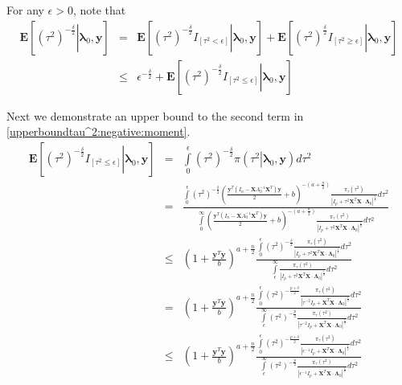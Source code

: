 \documentclass[noinfoline,11pt]{imsart}
\numberwithin{equation}{section}
\theoremstyle{plain}
\newcommand{\y}{\mathbf{y}}
\newcommand{\X}{\mathbf{X}}
\newcommand{\bl}{\boldsymbol{\lambda}}
\newcommand{\Bl}{\boldsymbol{\Lambda}}
\newcommand{\E}{\boldsymbol{E}}
\begin{document}
\proof For any $\epsilon > 0$, note that 
\begin{eqnarray}\label{upperboundtau^2:negative:moment}
 \E\left[\left.\left(\tau^2\right)^{-\frac{\delta}{2}}\right| \bl_0,\y\right]&=&\E\left[\left.\left(\tau^2\right)^{-\frac{\delta}{2}}I_{\left[\tau^2<\epsilon\right]}\right| \bl_0,\y\right]+\E\left[\left.\left(\tau^2\right)^{\frac{\delta}{2}}I_{\left[\tau^2\geq\epsilon\right]}\right| \bl_0,\y\right]\nonumber \\
&\leq & \epsilon^{-\frac{\delta}{2}}+\E\left[\left.\left(\tau^2\right)^{-\frac{\delta}{2}}I_{\left[\tau^2\leq\epsilon\right]}\right| \bl_0,\y\right] \end{eqnarray}

\noindent
Next we demonstrate an upper bound to the second term in \eqref{upperboundtau^2:negative:moment}.
\begin{eqnarray}
 \E\left[\left.\left(\tau^2\right)^{-\frac{\delta}{2}}I_{\left[\tau^2\leq\epsilon\right]}\right| \bl_0,\y\right]&=&\int\limits_0^{\epsilon}\left(\tau^2\right)^{-\frac{\delta}{2}}\pi\left(\left.\tau^2\right|\bl_0,\y\right)d\tau^2 \nonumber\\
 &=& \frac{\int\limits_0^{\epsilon}\left(\tau^2\right)^{-\frac{\delta}{2}}\left(\frac{\y^T\left(I_n-\X A_0^{-1}\X^T\right)\y}{2}+b\right)^{-\left(a+\frac{n}{2}\right)}\frac{\pi_\tau\left(\tau^2\right)}{\left|I_p+\tau^2\X^T\X\cdot\Bl_0\right|^{\frac{1}{2}}}d\tau^2}{\int\limits_{0}^\infty\left(\frac{\y^T\left(I_n-\X A_0^{-1}\X^T\right)\y}{2}+b\right)^{-\left(a+\frac{n}{2}\right)}\frac{\pi_\tau\left(\tau^2\right)}{\left|I_p+\tau^2\X^T\X\cdot\Bl_0\right|^{\frac{1}{2}}}d\tau^2} \nonumber\\
 &\leq& \left(1+\frac{\y^T\y}{b}\right)^{a+\frac{n}{2}}\frac{\int\limits_0^{\epsilon}\left(\tau^2\right)^{-\frac{\delta}{2}}\frac{\pi_\tau\left(\tau^2\right)}{\left|I_p+\tau^2\X^T\X\cdot\Bl_0\right|^{\frac{1}{2}}}d\tau^2}{\int\limits_\epsilon^\infty\frac{\pi_\tau\left(\tau^2\right)}{\left|I_p+\tau^2\X^T\X\cdot\Bl_0\right|^{\frac{1}{2}}}d\tau^2} \nonumber\\
 &=& \left(1+\frac{\y^T\y}{b}\right)^{a+\frac{n}{2}}\frac{\int\limits_0^{\epsilon}\left(\tau^2\right)^{-\frac{p+\delta}{2}}\frac{\pi_\tau\left(\tau^2\right)}{\left|\tau^{-2}I_p+\X^T\X\cdot\Bl_0\right|^{\frac{1}{2}}}d\tau^2}{\int\limits_\epsilon^\infty\left(\tau^2\right)^{-\frac{p}{2}}\frac{\pi_\tau\left(\tau^2\right)}{\left|\tau^{-2}I_p+\X^T\X\cdot\Bl_0\right|^{\frac{1}{2}}}d\tau^2} \nonumber\\
 &\leq& \left(1+\frac{\y^T\y}{b}\right)^{a+\frac{n}{2}}\frac{\int\limits_0^{\epsilon}\left(\tau^2\right)^{-\frac{p+\delta}{2}}\frac{\pi_\tau\left(\tau^2\right)}{\left|\epsilon^{-1}I_p+\X^T\X\cdot\Bl_0\right|^{\frac{1}{2}}}d\tau^2}{\int\limits_\epsilon^\infty\left(\tau^2\right)^{-\frac{p}{2}} \frac{\pi_\tau\left(\tau^2\right)}{\left|\epsilon^{-1}I_p+\X^T\X\cdot\Bl_0\right|^{\frac{1}{2}}}d\tau^2} \nonumber\\

\end{eqnarray}
\end{document}
